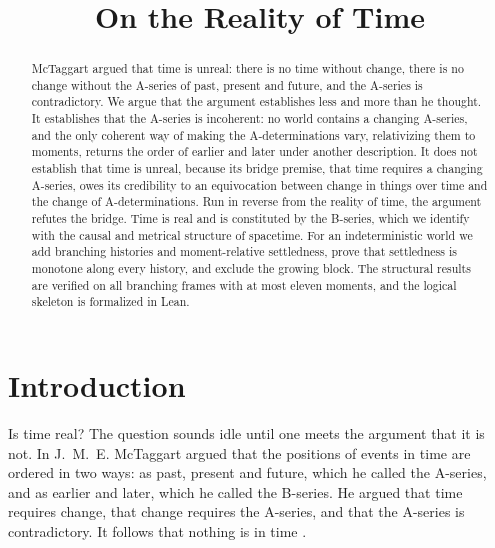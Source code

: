 \documentclass{situationist-preprint}
\title{On the Reality of Time}
\begin{document}
\maketitle

\begin{abstract}
McTaggart argued that time is unreal: there is no time without change, there is no change without the A-series of past, present and future, and the A-series is contradictory. We argue that the argument establishes less and more than he thought. It establishes that the A-series is incoherent: no world contains a changing A-series, and the only coherent way of making the A-determinations vary, relativizing them to moments, returns the order of earlier and later under another description. It does not establish that time is unreal, because its bridge premise, that time requires a changing A-series, owes its credibility to an equivocation between change in things over time and the change of A-determinations. Run in reverse from the reality of time, the argument refutes the bridge. Time is real and is constituted by the B-series, which we identify with the causal and metrical structure of spacetime. For an indeterministic world we add branching histories and moment-relative settledness, prove that settledness is monotone along every history, and exclude the growing block. The structural results are verified on all \NFrames{} branching frames with at most eleven moments, and the logical skeleton is formalized in Lean.
\end{abstract}

\section{Introduction}\label{s:intro}

Is time real? The question sounds idle until one meets the argument that it is not. In \citeyear{McTaggart1908} J.~M.~E. McTaggart argued that the positions of events in time are ordered in two ways: as past, present and future, which he called the A-series, and as earlier and later, which he called the B-series. He argued that time requires change, that change requires the A-series, and that the A-series is contradictory. It follows that nothing is in time \citep{McTaggart1908,McTaggart1927}.
\end{document}
